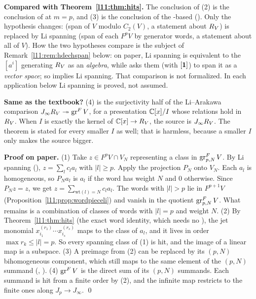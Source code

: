 \begin{dictionary}
\textbf{Compared with Theorem~\ref{l11:thm:hits}.} The conclusion of (2) is the conclusion of
\allowbreak{}\allowbreak{}\allowbreak{}\allowbreak{}\allowbreak{}
at $m=p$, and (3) is the conclusion of the -based
\allowbreak{}\allowbreak{}\allowbreak{}
(). Only the hypothesis changes:  (span of
$V$ modulo $C_2(V)$, a statement about $R_V$) is replaced by Li spanning (span of each $F^pV$ by generator words, a
statement about all of $V$). How the two hypotheses compare is the subject of Remark~\ref{l11:rem:hdechspan} below: on
paper, Li spanning is equivalent to the $[a^i]$ generating $R_V$ as an \emph{algebra}, while  asks
them (with $[\mathbf{1}]$) to span it as a \emph{vector space}; so  implies Li spanning. That comparison is
not formalized. In each application below Li spanning is proved, not assumed.

\textbf{Same as the textbook?} (4) is the surjectivity half of the Li--Arakawa comparison
$J_\infty R_V\twoheadrightarrow\operatorname{gr}^FV$, for a presentation ${\mathbb{C}}[x]/I$ whose relations hold in $R_V$. When
$I$ is exactly the kernel of ${\mathbb{C}}[x]\to R_V$, the source is $J_\infty R_V$. The theorem is stated for every
smaller $I$ as well; that is harmless, because a smaller $I$ only makes the source bigger.
\end{dictionary}

\textbf{Proof on paper.} (1) Take $z\in F^pV\cap V_N$ representing a class in $\operatorname{gr}^F_{p,N}V$. By Li spanning (),
$z = \sum_lc_la_l$ with $|l|\ge p$. Apply the projection $P_N$ onto $V_N$. Each $a_l$ is homogeneous, so
$P_Na_l$ is $a_l$ if the word has weight $N$ and $0$ otherwise. Since $P_Nz = z$, we get
$z = \sum_{\mathrm{wt}(l)=N}c_la_l$. The words with $|l|>p$ lie in $F^{p+1}V$ (Proposition~\ref{l11:prop:wordpieceli}) and
vanish in the quotient $\operatorname{gr}^F_{p,N}V$. What remains is a combination of classes of words with $|l| = p$ and
weight $N$. (2) By Theorem~\ref{l11:thm:hits} (the exact word identity, which needs no ), the jet monomial
$x_{i_1}^{(r_1)}\cdots x_{i_s}^{(r_s)}$ maps to the class of $a_l$, and it lives in order $\max r_k\le|l| = p$. So every
spanning class of (1) is hit, and the image of a linear map is a subspace. (3) A preimage from (2) can be replaced by
its $(p,N)$ bihomogeneous component, which still maps to the same element of the $(p,N)$ summand
(\allowbreak{}\allowbreak{}\allowbreak{}\allowbreak{},
). (4) $\operatorname{gr}^FV$ is the direct sum of its $(p,N)$ summands. Each summand is hit from a
finite order by (2), and the infinite map restricts to the finite ones along $J_p\to J_\infty$. \qed

